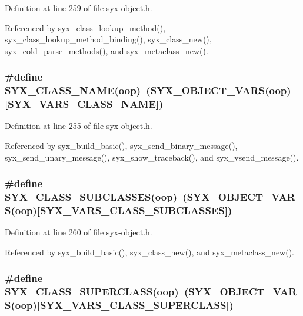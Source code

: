Definition at line 259 of file syx-object.h.

Referenced by syx\_\-class\_\-lookup\_\-method(), syx\_\-class\_\-lookup\_\-method\_\-binding(), syx\_\-class\_\-new(), syx\_\-cold\_\-parse\_\-methods(), and syx\_\-metaclass\_\-new().\hypertarget{syx-object_8h_d772af235c9512a18d5cbb8e9d0bb022}{
\subsubsection{\setlength{\rightskip}{0pt plus 5cm}\#define SYX\_\-CLASS\_\-NAME(oop)~(SYX\_\-OBJECT\_\-VARS(oop)\mbox{[}SYX\_\-VARS\_\-CLASS\_\-NAME\mbox{]})}}
\label{syx-object_8h_d772af235c9512a18d5cbb8e9d0bb022}




Definition at line 255 of file syx-object.h.

Referenced by syx\_\-build\_\-basic(), syx\_\-send\_\-binary\_\-message(), syx\_\-send\_\-unary\_\-message(), syx\_\-show\_\-traceback(), and syx\_\-vsend\_\-message().\hypertarget{syx-object_8h_a31a4efab7eb3f8fa35c78e9d9230102}{
\subsubsection{\setlength{\rightskip}{0pt plus 5cm}\#define SYX\_\-CLASS\_\-SUBCLASSES(oop)~(SYX\_\-OBJECT\_\-VARS(oop)\mbox{[}SYX\_\-VARS\_\-CLASS\_\-SUBCLASSES\mbox{]})}}
\label{syx-object_8h_a31a4efab7eb3f8fa35c78e9d9230102}




Definition at line 260 of file syx-object.h.

Referenced by syx\_\-build\_\-basic(), syx\_\-class\_\-new(), and syx\_\-metaclass\_\-new().\hypertarget{syx-object_8h_5307ee0e36a40bca0cc49aec373c4232}{
\subsubsection{\setlength{\rightskip}{0pt plus 5cm}\#define SYX\_\-CLASS\_\-SUPERCLASS(oop)~(SYX\_\-OBJECT\_\-VARS(oop)\mbox{[}SYX\_\-VARS\_\-CLASS\_\-SUPERCLASS\mbox{]})}}
\label{syx-object_8h_5307ee0e36a40bca0cc49aec373c4232}




